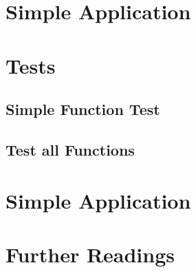 \section{Simple Application}



\section{Tests}

\subsection{Simple Function Test}

\subsection{Test all Functions}

\section{Simple Application}


\section{Further Readings}


